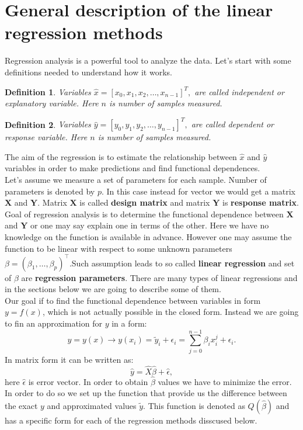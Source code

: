 \documentclass[10pt]{article}
\newtheorem{defn}{Definition}
\begin{document}
\section{General description of the linear regression methods} \label{Theory}
Regression analysis is a powerful tool to analyze the data. Let's start with some definitions needed to understand how it works.
\begin{defn}
Variables $\hat{x} = [x_0,x_1, x_2,\dots, x_{n-1}]^T,$ are called independent  or explanatory variable. Here $n$ is number of samples measured.
\end{defn}

\begin{defn}
	Variables  $\hat{y} = [y_0,y_1, y_2,\dots, y_{n-1}]^T,$ are called dependent or response variable. Here $n$ is number of samples measured.
\end{defn}
The aim of the regression is to estimate the relationship between $\hat{x}$ and $\hat{y}$ variables in order to make predictions and find functional dependences. \\
Let's assume we measure a set of parameters for each sample. Number of parameters is denoted by $p$. In this case instead for vector we would get a matrix $\textbf{X}$ and $\textbf{Y}$. Matrix $\textbf{X}$ is called \textbf{design matrix} and matrix $\textbf{Y}$ is \textbf{response matrix}. Goal of regression analysis is to determine the functional dependence between $\textbf{X}$ and $\textbf{Y}$ or one may say explain one in terms of the other. Here we have no knowledge on the function is available in advance. However one may assume the function to be linear with respect to some unknown parameters $\beta = (\beta_1, \ldots, \beta_p)^{\top}$.Such assumption leads to so called \textbf{linear regression} and set of $\beta$  are \textbf{regression parameters}. There are many types of linear regressions and in the sections below we are going to describe some of them.\\
Our goal if to find the functional dependence between variables in form $y=f(x)$, which is not actually possible in the closed form. Instead we are going to fin an approximation for $y$ in a form:
\begin{equation}
y=y(x) \rightarrow y(x_i)=\tilde{y}_i+\epsilon_i=\sum_{j=0}^{n-1} \beta_i x_i^j+\epsilon_i.
\end{equation}
In matrix form it can be written as:
\begin{equation}
\hat{y} = \hat{X}\hat{\beta}+\hat{\epsilon},
\end{equation}
here $\hat{\epsilon}$ is error vector.
In order to obtain $\hat{\beta}$ values we have to minimize the error.
In order to do so we set up the function that provide us the difference between the exact $y$ and approximated values $\tilde{y}$. This function is denoted as $Q(\hat{\beta})$ and has a specific form for each of the regression methods disscused below.
\end{document}
